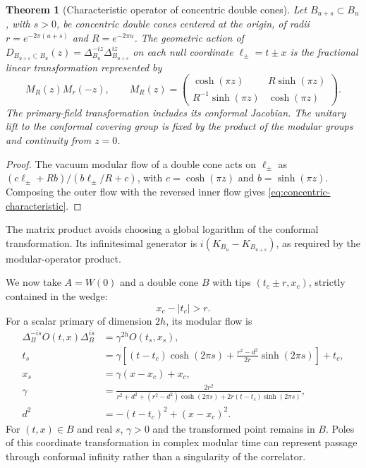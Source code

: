 \documentclass[a4paper,11pt]{article}
\newtheorem{theorem}{Theorem}
\theoremstyle{definition}
\begin{document}
\begin{theorem}[Characteristic operator of concentric double cones]
\label{thm:concentric-characteristic}
Let $B_{u+s}\subset B_u$, with $s>0$, be concentric double cones centered at the origin, of radii $r=e^{-2\pi(u+s)}$ and $R=e^{-2\pi u}$. The geometric action of $D_{B_{u+s}\subset B_u}(z)=\Delta_{B_u}^{-iz}\Delta_{B_{u+s}}^{iz}$ on each null coordinate $\ell_\pm=t\pm x$ is the fractional linear transformation represented by
\begin{equation}
 M_R(z)M_r(-z),\qquad
 M_R(z)=
 \begin{pmatrix}
  \cosh(\pi z)&R\sinh(\pi z)\\
  R^{-1}\sinh(\pi z)&\cosh(\pi z)
 \end{pmatrix}.
 \label{eq:concentric-characteristic}
\end{equation}
The primary-field transformation includes its conformal Jacobian. The unitary lift to the conformal covering group is fixed by the product of the modular groups and continuity from $z=0$.
\end{theorem}
\begin{proof}
The vacuum modular flow of a double cone acts on $\ell_\pm$ as $(c\ell_\pm+R b)/(b\ell_\pm/R+c)$, with $c=\cosh(\pi z)$ and $b=\sinh(\pi z)$. Composing the outer flow with the reversed inner flow gives \eqref{eq:concentric-characteristic}.
\end{proof}

The matrix product avoids choosing a global logarithm of the conformal transformation. Its infinitesimal generator is $i(K_{B_u}-K_{B_{u+s}})$, as required by the modular-operator product.

We now take $A=W(0)$ and a double cone $B$ with tips $(t_c\pm r,x_c)$, strictly contained in the wedge:
\[
 x_c-|t_c|>r.
\]
For a scalar primary of dimension $2h$, its modular flow is
\begin{align}
 \Delta_B^{-is}O(t,x)\Delta_B^{is}
 &=\gamma^{2h}O(t_s,x_s),
 \label{eq:ball-modular-flow}\\
 t_s&=\gamma\left[(t-t_c)\cosh(2\pi s)
       +\frac{r^2-d^2}{2r}\sinh(2\pi s)\right]+t_c,
 \label{eq:ball-time}\\
 x_s&=\gamma(x-x_c)+x_c,
 \label{eq:ball-space}\\
 \gamma&=\frac{2r^2}{r^2+d^2+(r^2-d^2)\cosh(2\pi s)
                       +2r(t-t_c)\sinh(2\pi s)},
 \label{eq:ball-conformal-factor}\\
 d^2&=-(t-t_c)^2+(x-x_c)^2.
 \label{eq:ball-distance}
\end{align}
For $(t,x)\in B$ and real $s$, $\gamma>0$ and the transformed point remains in $B$. Poles of this coordinate transformation in complex modular time can represent passage through conformal infinity rather than a singularity of the correlator.
\end{document}
